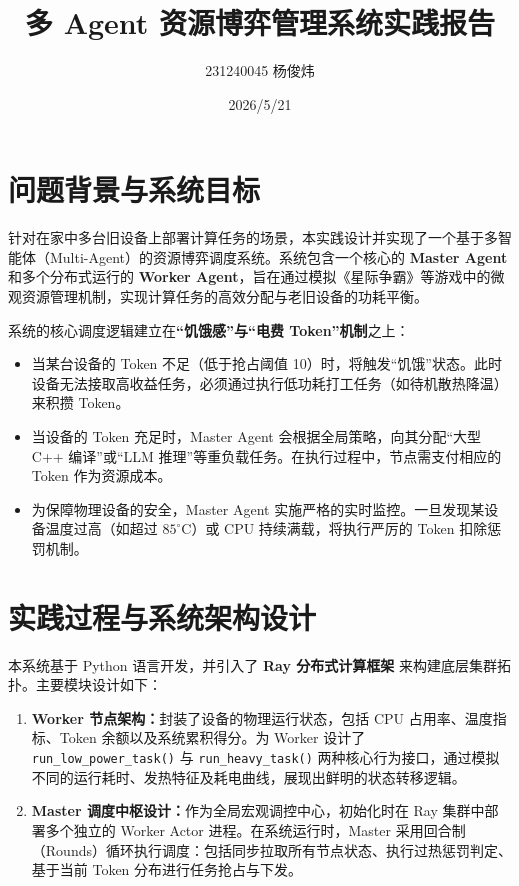 \documentclass[11pt,a4paper]{ctexart}
\title{\vspace{-2cm}\textbf{多 Agent 资源博弈管理系统实践报告}}
\author{231240045 杨俊炜}
\date{2026/5/21}
\begin{document}
\maketitle
\vspace{-1.5cm}

\section{问题背景与系统目标}
针对在家中多台旧设备上部署计算任务的场景，本实践设计并实现了一个基于多智能体（Multi-Agent）的资源博弈调度系统。系统包含一个核心的 \textbf{Master Agent} 和多个分布式运行的 \textbf{Worker Agent}，旨在通过模拟《星际争霸》等游戏中的微观资源管理机制，实现计算任务的高效分配与老旧设备的功耗平衡。

系统的核心调度逻辑建立在\textbf{“饥饿感”与“电费 Token”机制}之上：
\begin{itemize}[leftmargin=*]
    \item 当某台设备的 Token 不足（低于抢占阈值 10）时，将触发“饥饿”状态。此时设备无法接取高收益任务，必须通过执行低功耗打工任务（如待机散热降温）来积攒 Token。
    \item 当设备的 Token 充足时，Master Agent 会根据全局策略，向其分配“大型 C++ 编译”或“LLM 推理”等重负载任务。在执行过程中，节点需支付相应的 Token 作为资源成本。
    \item 为保障物理设备的安全，Master Agent 实施严格的实时监控。一旦发现某设备温度过高（如超过 $85^\circ\text{C}$）或 CPU 持续满载，将执行严厉的 Token 扣除惩罚机制。
\end{itemize}

\section{实践过程与系统架构设计}
本系统基于 Python 语言开发，并引入了 \textbf{Ray 分布式计算框架} 来构建底层集群拓扑。主要模块设计如下：
\begin{enumerate}[leftmargin=*]
    \item \textbf{Worker 节点架构：}封装了设备的物理运行状态，包括 CPU 占用率、温度指标、Token 余额以及系统累积得分。为 Worker 设计了 \texttt{run\_low\_power\_task()} 与 \texttt{run\_heavy\_task()} 两种核心行为接口，通过模拟不同的运行耗时、发热特征及耗电曲线，展现出鲜明的状态转移逻辑。
    \item \textbf{Master 调度中枢设计：}作为全局宏观调控中心，初始化时在 Ray 集群中部署多个独立的 Worker Actor 进程。在系统运行时，Master 采用回合制（Rounds）循环执行调度：包括同步拉取所有节点状态、执行过热惩罚判定、基于当前 Token 分布进行任务抢占与下发。
\end{enumerate}
\end{document}
